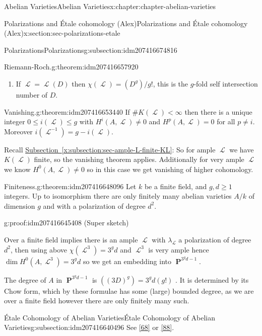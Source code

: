 \documentclass[oneside,10pt,]{book}
\numberwithin{equation}{section}
\newcommand{\sheaf}[1]{\operatorname{\mathcal{#1}}}
\DeclareMathOperator{\PP}{\mathbf{P}}
\newcommand{\lt}{<}
\begin{document}
\begin{chapterptx}{Abelian Varieties}{}{Abelian Varieties}{}{}{x:chapter:chapter-abelian-varieties}
\begin{sectionptx}{Polarizations and Étale cohomology (Alex)}{}{Polarizations and Étale cohomology (Alex)}{}{}{x:section:sec-polarizations-etale}
\begin{subsectionptx}{Polarizations}{}{Polarizations}{}{}{g:subsection:idm207416674816}
\begin{theorem}{Riemann-Roch.}{}{g:theorem:idm207416657920}
\begin{enumerate}
\item{}If \(\sheaf L = \sheaf L(D)\) then \(\chi(\sheaf L) = (D^g)/g!\), this is the \(g\)-fold self intersection number of \(D\).%
\end{enumerate}
%
\end{theorem}
\begin{theorem}{Vanishing.}{}{g:theorem:idm207416653440}%
If \(\#K( \sheaf L)\lt \infty\) then there is a unique integer \(0\le i(\sheaf L) \le g\) with \(H^i(A, \sheaf L) \ne  0\) and \(H^p(A, \sheaf L) = 0\) for all \(p \ne i\). Moreover \(i(\sheaf L^{-1}) = g - i(\sheaf L)\).%
\end{theorem}
Recall \hyperref[x:subsection:sec-ample-L-finite-KL]{Subsection~\ref{x:subsection:sec-ample-L-finite-KL}}: So for ample \(\sheaf L\) we have \(K(\sheaf L)\) finite, so the vanishing theorem applies. Additionally for very ample \(\sheaf L\) we know \(H^0(A,\sheaf L) \ne 0\) so in this case we get vanishing of higher cohomology.%
\begin{theorem}{Finiteness.}{}{g:theorem:idm207416648096}%
Let \(k\) be a finite field, and   \(g,d\ge 1\) integers. Up to isomorphism there are only finitely many abelian varieties \(A/k\) of dimension \(g\) and with a polarization of degree \(d^2\).%
\end{theorem}
\begin{proofptx}{}{g:proof:idm207416645408}
(Super sketch)%
\par
Over a finite field implies there is an ample \(\sheaf L\) with \(\lambda_{\sheaf L}\) a polarization of degree \(d^2\), then using above \(\chi(\sheaf L^3) = 3^g d\) and \(\sheaf L^3\) is very ample hence \(\dim H^0(A, \sheaf L^3) = 3^g d\) so we get an embedding into \(\PP^{3^g d - 1}\).%
\par
The degree of \(A\) in \(\PP^{3^g d - 1}\) is \(((3D)^g) = 3^g d(g!)\) . It is determined by its Chow form, which by these formulae has some (large) bounded degree, as we are over a finite field however there are only finitely many such.%
\end{proofptx}
\end{subsectionptx}
%
%
\typeout{************************************************}
\typeout{************************************************}
%
\begin{subsectionptx}{Étale Cohomology of Abelian Varieties}{}{Étale Cohomology of Abelian Varieties}{}{}{g:subsection:idm207416640496}
See \hyperlink{x:biblio:bib-milne-etale}{[68]} or \hyperlink{x:biblio:bib-tamme}{[88]}.%

\end{subsectionptx}
\end{sectionptx}
\end{chapterptx}
\end{document}
